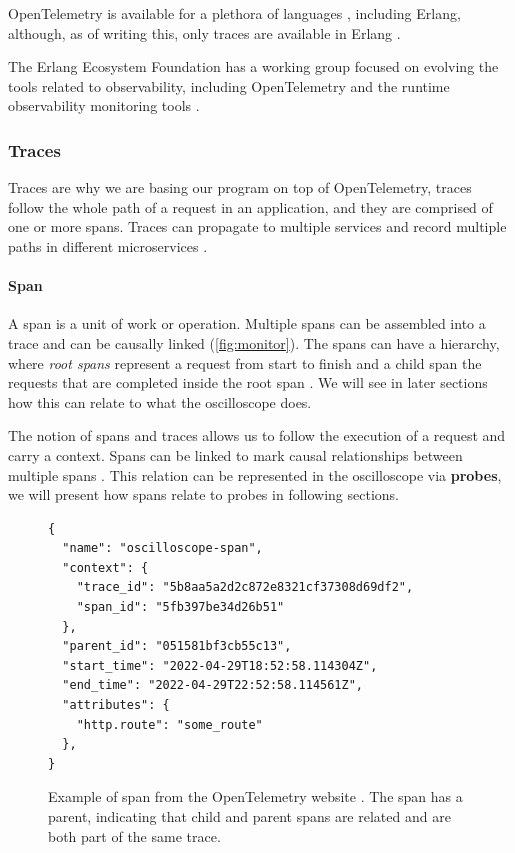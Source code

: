    OpenTelemetry is available for a plethora of languages \cite{otel-l}, including Erlang, although, as of writing this, only traces are available in Erlang \cite{otel-in}.
     
    The Erlang Ecosystem Foundation has a working group focused on evolving the tools related to observability, including OpenTelemetry and the runtime observability monitoring tools \cite{obs-group}. 
    
    \subsubsection{Traces}
        Traces are why we are basing our program on top of OpenTelemetry, traces follow the whole path of a request in an application, and they are comprised of one or more spans. Traces can propagate to multiple services and record multiple paths in different microservices \cite{otel-dt}. 
        
        \paragraph{Span} A span is a unit of work or operation. Multiple spans can be assembled into a trace and can be causally linked (\cref{fig:monitor}). The spans can have a hierarchy, where \textit{root spans} represent a request from start to finish and a child span the requests that are completed inside the root span \cite{otel-dt}. We will see in later sections how this can relate to what the oscilloscope does.

    The notion of spans and traces allows us to follow the execution of a request and carry a context. Spans can be linked to mark causal relationships between multiple spans \cite{otel-t}. This relation can be represented in the oscilloscope via \textbf{probes}, we will present how spans relate to probes in following sections.
    \begin{figure}[H]
    \begin{verbatim} 
{
  "name": "oscilloscope-span",
  "context": {
    "trace_id": "5b8aa5a2d2c872e8321cf37308d69df2",
    "span_id": "5fb397be34d26b51"
  },
  "parent_id": "051581bf3cb55c13",
  "start_time": "2022-04-29T18:52:58.114304Z",
  "end_time": "2022-04-29T22:52:58.114561Z",
  "attributes": {
    "http.route": "some_route"
  },
}
    \end{verbatim}
    \caption{Example of span from the OpenTelemetry website \cite{otel-t}. The span has a parent, indicating that child and parent spans are related and are both part of the same trace.}%
    \end{figure}

